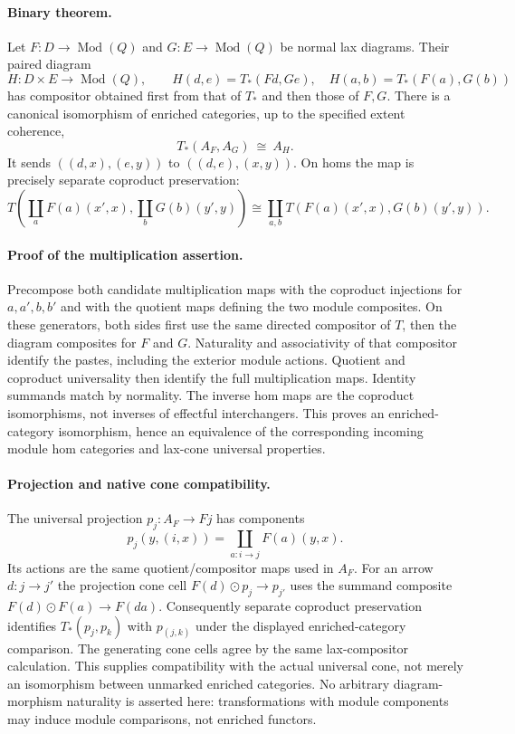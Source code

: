 \documentclass{article}
\begin{document}
\paragraph{Binary theorem.} Let $F:D\to\operatorname{Mod}(Q)$ and $G:E\to\operatorname{Mod}(Q)$ be normal lax diagrams. Their paired diagram
\[
 H:D\times E\to\operatorname{Mod}(Q),\qquad
 H(d,e)=T_*(Fd,Ge),\quad H(a,b)=T_*(F(a),G(b))
\]
has compositor obtained first from that of $T_*$ and then those of $F,G$. There is a canonical isomorphism of enriched categories, up to the specified extent coherence,
\[
 T_*(A_F,A_G)\ \cong\ A_H.
\]
It sends $((d,x),(e,y))$ to $((d,e),(x,y))$. On homs the map is precisely separate coproduct preservation:
\[
 T\!\left(\coprod_aF(a)(x',x),\coprod_bG(b)(y',y)\right)
 \cong\coprod_{a,b}T(F(a)(x',x),G(b)(y',y)).
\]

\paragraph{Proof of the multiplication assertion.} Precompose both candidate multiplication maps with the coproduct injections for $a,a',b,b'$ and with the quotient maps defining the two module composites. On these generators, both sides first use the same directed compositor of $T$, then the diagram composites for $F$ and $G$. Naturality and associativity of that compositor identify the pastes, including the exterior module actions. Quotient and coproduct universality then identify the full multiplication maps. Identity summands match by normality. The inverse hom maps are the coproduct isomorphisms, not inverses of effectful interchangers. This proves an enriched-category isomorphism, hence an equivalence of the corresponding incoming module hom categories and lax-cone universal properties.

\paragraph{Projection and native cone compatibility.} The universal projection $p_j:A_F\to Fj$ has components
\[
 p_j(y,(i,x))=\coprod_{a:i\to j}F(a)(y,x).
\]
Its actions are the same quotient/compositor maps used in $A_F$. For an arrow $d:j\to j'$ the projection cone cell $F(d)\odot p_j\to p_{j'}$ uses the summand composite $F(d)\odot F(a)\to F(da)$. Consequently separate coproduct preservation identifies $T_*(p_j,p_k)$ with $p_{(j,k)}$ under the displayed enriched-category comparison. The generating cone cells agree by the same lax-compositor calculation. This supplies compatibility with the actual universal cone, not merely an isomorphism between unmarked enriched categories. No arbitrary diagram-morphism naturality is asserted here: transformations with module components may induce module comparisons, not enriched functors.
\end{document}
